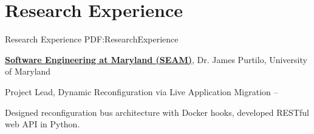 
\section
{Research Experience}
{Research Experience}
{PDF:ResearchExperience}

\href{https://seam.cs.umd.edu/}
{\textbf{Software Engineering at Maryland (SEAM)}},
Dr. James Purtilo,
University of Maryland

\GapNoBreak
\hspace{1em} 
Project Lead, Dynamic Reconfiguration via Live Application Migration
\hfill
{} --
\begin{detail}
\SubBulletItem
Designed reconfiguration bus architecture with Docker hooks, developed RESTful web API in Python.
\end{detail}

